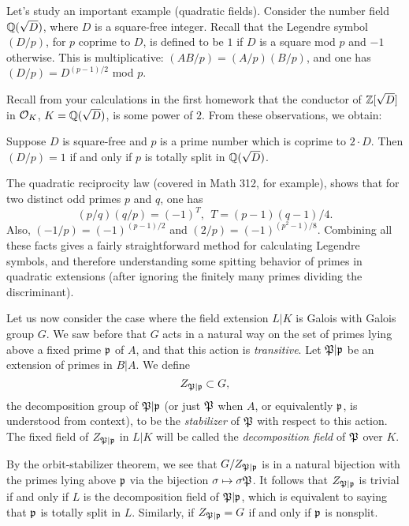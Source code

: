 Let's study an important example (quadratic fields).
Consider the number field $\mathbb{Q}(\sqrt{D})$, where $D$ is a square-free integer.
Recall that the Legendre symbol $(D/p)$, for $p$ coprime to $D$, is defined to be $1$ if $D$ is a square mod $p$ and $-1$ otherwise.
This is multiplicative: $(AB/p) = (A/p)(B/p)$, and one has $(D/p) = D^{(p-1)/2}$ mod $p$.

Recall from your calculations in the first homework that the conductor of $\mathbb{Z}[\sqrt{D}]$ in $\mathcal{O}_{K}$, $K = \mathbb{Q}(\sqrt{D})$, is some power of $2$.
From these observations, we obtain:
\begin{proposition}
  Suppose $D$ is square-free and $p$ is a prime number which is coprime to $2 \cdot D$.
  Then $(D/p) = 1$ if and only if $p$ is totally split in $\mathbb{Q}(\sqrt{D})$.
\end{proposition}

The quadratic reciprocity law (covered in Math 312, for example), shows that for two distinct odd primes $p$ and $q$, one has
\[ (p/q)(q/p) = (-1)^{T}, \ \ T = (p-1)(q-1)/4. \]
Also, $(-1/p) = (-1)^{(p-1)/2}$ and $(2/p) = (-1)^{(p^{2}-1)/8}$.
Combining all these facts gives a fairly straightforward method for calculating Legendre symbols, and therefore understanding some spitting behavior of primes in quadratic extensions (after ignoring the finitely many primes dividing the discriminant).

Let us now consider the case where the field extension $L|K$ is Galois with Galois group $G$.
We saw before that $G$ acts in a natural way on the set of primes lying above a fixed prime $\mathfrak{p}$ of $A$, and that this action is \emph{transitive}.
Let $\mathfrak{P}|\mathfrak{p}$ be an extension of primes in $B|A$.
We define
\[ Z_{\mathfrak{P}|\mathfrak{p}} \subset G, \]
the decomposition group of $\mathfrak{P}|\mathfrak{p}$ (or just $\mathfrak{P}$ when $A$, or equivalently $\mathfrak{p}$, is understood from context), to be the \emph{stabilizer} of $\mathfrak{P}$ with respect to this action.
The fixed field of $Z_{\mathfrak{P}|\mathfrak{p}}$ in $L|K$ will be called the \emph{decomposition field} of $\mathfrak{P}$ over $K$.

By the orbit-stabilizer theorem, we see that $G/Z_{\mathfrak{P}|\mathfrak{p}}$ is in a natural bijection with the primes lying above $\mathfrak{p}$ via the bijection $\sigma \mapsto \sigma\mathfrak{P}$.
It follows that $Z_{\mathfrak{P}|\mathfrak{p}}$ is trivial if and only if $L$ is the decomposition field of $\mathfrak{P}|\mathfrak{p}$, which is equivalent to saying that $\mathfrak{p}$ is totally split in $L$.
Similarly, if $Z_{\mathfrak{P}|\mathfrak{p}} = G$ if and only if $\mathfrak{p}$ is nonsplit.

